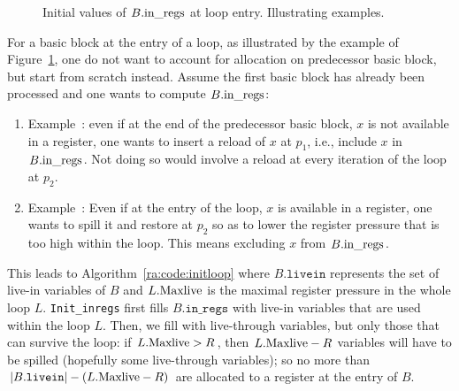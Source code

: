 {\begin{figure}
  \begin{center}
    \hfil
  \end{center}
  \caption{\label{fig:ra:loopentry_example}Initial values of $B.\textrm{in\_regs}$ at loop entry. Illustrating examples.}
\end{figure}
For a basic block at the entry of a loop, as illustrated by the example of Figure~\ref{fig:ra:loopentry_example}, one do not want to account for allocation on predecessor basic block, but start from scratch instead.
Assume the first basic block has already been processed and one wants to compute $B.\textrm{in\_regs}$:
\begin{enumerate}
  \item Example~: 
  even if at the end of the predecessor basic block, $x$ is not available in a register, one wants to insert a reload of $x$ at $p_1$, i.e., include $x$ in $B.\textrm{in\_regs}$.
  Not doing so would involve a reload at every iteration of the loop at $p_2$. 
\item Example~: 
  Even if at the entry of the loop, $x$ is available in a register, one wants to spill it and restore at $p_2$ so as to lower the register pressure that is too high within the loop.
  This means excluding $x$ from $B.\textrm{in\_regs}$.
\end{enumerate}
This leads to Algorithm~\ref{ra:code:initloop} where $B.\texttt{livein}$ represents the set of live-in variables of $B$ and $L.\mathrm{Maxlive}$ is the maximal register pressure in the whole loop $L$.
\texttt{Init\_inregs} first fills $B.\texttt{in\_regs}$ with live-in variables that are used within the loop $L$.
Then, we fill with live-through variables, but only those that can survive the loop:
if $L.\mathrm{Maxlive}>R$, then  $L.\mathrm{Maxlive}-R$ variables will have to be spilled (hopefully some live-through variables);
so no more than $|B.\texttt{livein}|-(L.\mathrm{Maxlive}-R)$ are allocated to a register at the entry of $B$.

}
